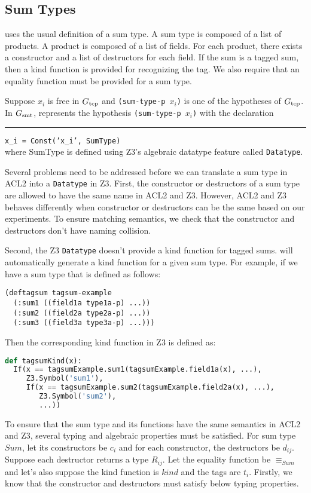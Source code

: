 \subsection{Sum Types}\label{subsec:soundsumtype}
\smtlink{} uses the usual definition of a sum type. A sum type is composed of a 
list of products. A product is composed of a list of fields. For each product,
there exists a constructor and a list of destructors for each field. If the sum
is a tagged sum, then a kind function is provided for recognizing the tag. We
also require that an equality function must be provided for a sum type.

Suppose  $x_i$ is free in $G_{\mathrm{tcp}}$ and \texttt{(sum-type-p $x_i$)} is one of
the hypotheses of $G_{\mathrm{tcp}}$. In $G_{\mathrm{smt}}$, \smtlink{} represents the hypothesis
\texttt{(sum-type-p $x_i$)} with the declaration\\
\rule{2em}{0ex}\texttt{x\_i = Const('x\_i', SumType)}\\
where SumType is defined using Z3's algebraic datatype feature called \texttt{Datatype}. 

Several problems need to be addressed before we can translate a sum type in ACL2
into a \texttt{Datatype} in Z3. First, the constructor or destructors of a
sum type are allowed to have the same name in ACL2 and Z3. However, ACL2 and Z3
behaves differently when constructor or destructors can be the same based on our
experiments. To ensure matching semantics, we check that the constructor and
destructors don't have naming collision.

Second, the Z3 \texttt{Datatype} doesn't provide a kind function for tagged
sums. \smtlink{} will automatically generate a kind function for a given sum
type. For example, if we have a sum type that is defined as follows:
\begin{lstlisting}[language=LISP]
(deftagsum tagsum-example
  (:sum1 ((field1a type1a-p) ...))
  (:sum2 ((field2a type2a-p) ...))
  (:sum3 ((field3a type3a-p) ...)))
\end{lstlisting}
Then the corresponding kind function in Z3 is defined as:
\begin{lstlisting}[language=Python]
def tagsumKind(x):
  If(x == tagsumExample.sum1(tagsumExample.field1a(x), ...),
     Z3.Symbol('sum1'),
     If(x == tagsumExample.sum2(tagsumExample.field2a(x), ...),
        Z3.Symbol('sum2'),
        ...))
\end{lstlisting}

To ensure that the sum type and its functions have the same semantics in ACL2
and Z3, several typing and algebraic properties must be satisfied. For sum type
$Sum$, let its constructors be $c_i$ and for each constructor, the destructors
be $d_{ij}$. Suppose each destructor returns a type $R_{ij}$. Let the equality
function be $\equiv_{Sum}$ and let's also suppose the kind function is $kind$ and the
tags are $t_{i}$. Firstly, we know that the constructor and destructors must
satisfy below typing properties.

